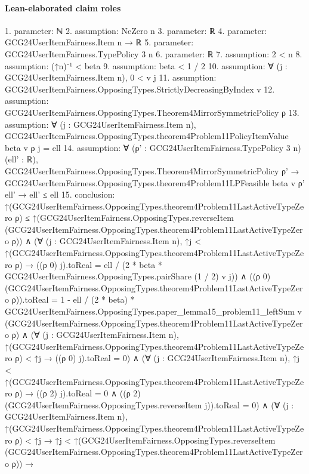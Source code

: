 \documentclass[10pt]{article}
\begin{document}
\paragraph{Lean-elaborated claim roles}\begin{ReviewVerbatim}
1. parameter: ℕ
2. assumption: NeZero n
3. parameter: ℝ
4. parameter: GCG24UserItemFairness.Item n → ℝ
5. parameter: GCG24UserItemFairness.TypePolicy 3 n
6. parameter: ℝ
7. assumption: 2 < n
8. assumption: (↑n)⁻¹ < beta
9. assumption: beta < 1 / 2
10. assumption: ∀ (j : GCG24UserItemFairness.Item n), 0 < v j
11. assumption: GCG24UserItemFairness.OpposingTypes.StrictlyDecreasingByIndex v
12. assumption: GCG24UserItemFairness.OpposingTypes.Theorem4MirrorSymmetricPolicy ρ
13. assumption: ∀ (j : GCG24UserItemFairness.Item n),
  GCG24UserItemFairness.OpposingTypes.theorem4Problem11PolicyItemValue beta v ρ j = ell
14. assumption: ∀ (ρ' : GCG24UserItemFairness.TypePolicy 3 n) (ell' : ℝ),
  GCG24UserItemFairness.OpposingTypes.Theorem4MirrorSymmetricPolicy ρ' →
    GCG24UserItemFairness.OpposingTypes.theorem4Problem11LPFeasible beta v ρ' ell' → ell' ≤ ell
15. conclusion: ↑(GCG24UserItemFairness.OpposingTypes.theorem4Problem11LastActiveTypeZero ρ) ≤
    ↑(GCG24UserItemFairness.OpposingTypes.reverseItem
        (GCG24UserItemFairness.OpposingTypes.theorem4Problem11LastActiveTypeZero ρ)) ∧
  (∀ (j : GCG24UserItemFairness.Item n),
      ↑j < ↑(GCG24UserItemFairness.OpposingTypes.theorem4Problem11LastActiveTypeZero ρ) →
        ((ρ 0) j).toReal = ell / (2 * beta * GCG24UserItemFairness.OpposingTypes.pairShare (1 / 2) v j)) ∧
    ((ρ 0) (GCG24UserItemFairness.OpposingTypes.theorem4Problem11LastActiveTypeZero ρ)).toReal =
        1 -
          ell / (2 * beta) *
            GCG24UserItemFairness.OpposingTypes.paper_lemma15_problem11_leftSum v
              (GCG24UserItemFairness.OpposingTypes.theorem4Problem11LastActiveTypeZero ρ) ∧
      (∀ (j : GCG24UserItemFairness.Item n),
          ↑(GCG24UserItemFairness.OpposingTypes.theorem4Problem11LastActiveTypeZero ρ) < ↑j → ((ρ 0) j).toReal = 0) ∧
        (∀ (j : GCG24UserItemFairness.Item n),
            ↑j < ↑(GCG24UserItemFairness.OpposingTypes.theorem4Problem11LastActiveTypeZero ρ) →
              ((ρ 2) j).toReal = 0 ∧ ((ρ 2) (GCG24UserItemFairness.OpposingTypes.reverseItem j)).toReal = 0) ∧
          (∀ (j : GCG24UserItemFairness.Item n),
              ↑(GCG24UserItemFairness.OpposingTypes.theorem4Problem11LastActiveTypeZero ρ) < ↑j →
                ↑j <
                    ↑(GCG24UserItemFairness.OpposingTypes.reverseItem
                        (GCG24UserItemFairness.OpposingTypes.theorem4Problem11LastActiveTypeZero ρ)) →

\end{ReviewVerbatim}
\end{document}
